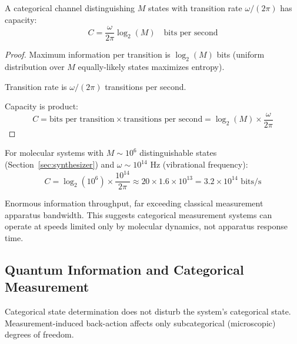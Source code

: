 \begin{theorem}
\label{thm:categorical_capacity}
A categorical channel distinguishing $M$ states with transition rate $\omega/(2\pi)$ has capacity:
\begin{equation}
C = \frac{\omega}{2\pi} \log_2(M) \quad \text{bits per second}
\end{equation}
\end{theorem}

\begin{proof}
Maximum information per transition is $\log_2(M)$ bits (uniform distribution over $M$ equally-likely states maximizes entropy).

Transition rate is $\omega/(2\pi)$ transitions per second.

Capacity is product:
\begin{equation}
C = \text{bits per transition} \times \text{transitions per second} = \log_2(M) \times \frac{\omega}{2\pi}
\end{equation}
\end{proof}

For molecular systems with $M \sim 10^6$ distinguishable states (Section~\ref{sec:synthesizer}) and $\omega \sim 10^{14}$ Hz (vibrational frequency):
\begin{equation}
C = \log_2(10^6) \times \frac{10^{14}}{2\pi} \approx 20 \times 1.6 \times 10^{13} = 3.2 \times 10^{14} \text{ bits/s}
\end{equation}

Enormous information throughput, far exceeding classical measurement apparatus bandwidth. This suggests categorical measurement systems can operate at speeds limited only by molecular dynamics, not apparatus response time.

\subsection{Quantum Information and Categorical Measurement}

\begin{proposition}
\label{prop:non_disturbing}
Categorical state determination does not disturb the system's categorical state. Measurement-induced back-action affects only subcategorical (microscopic) degrees of freedom.
\end{proposition}

